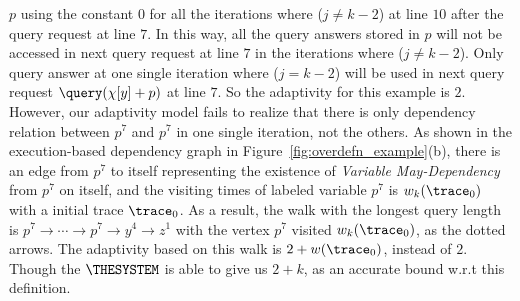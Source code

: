 \begin{example}
    $p$ using the constant $0$ for all the iterations where ($j \neq k - 2$) at line $10$ after the 
    query request at line $7$.
    In this way, all the query answers stored in $p$ will not be accessed in next query request at line $7$ in the iterations 
    where  ($j \neq k - 2$).
    Only query answer at one single iteration where ($j = k - 2 $) will be used in next query request
    $\query(\chi[y] + p)$ at line $7$.
    So the adaptivity for this example is $2$. 
    However, our adaptivity model fails to realize that there is only dependency relation 
    between $p^7$ and $p^7$ in one single iteration, 
    not the others. 
    As shown in the execution-based dependency graph in Figure~\ref{fig:overdefn_example}(b), 
    there is an edge from $p^7$ to itself representing the existence of \emph{Variable May-Dependency} from $p^7$ on itself,
    and the visiting times of labeled variable $p^7$ is 
    $w_k(\trace_0)$ with a initial trace $\trace_0$. 
    As a result, the walk with the longest query length 
    is
    $p^7  \to \cdots \to p^7 \to y^4  \to z^1 $ with the vertex $p^7$ visited $w_k(\trace_0)$,
    as the dotted arrows. 
    The adaptivity 
    based on
    this walk
    is $2 + w(\trace_0)$, instead of $2$. 
    Though the $\THESYSTEM$ is able to give us $2 + k$,  as an accurate bound w.r.t this definition.
    

\end{example}
